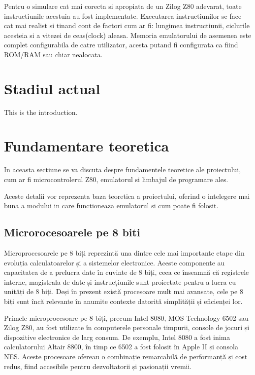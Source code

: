 \documentclass[titlepage,12pt]{article}
\begin{document}
    Pentru o simulare cat mai corecta si apropiata de un Zilog Z80 adevarat, toate instructiunile acestuia au fost implementate.
    Executarea instructiunilor se face cat mai realist si tinand cont de factori cum ar fi: lungimea instructiunii, ciclurile acesteia si a vitezei de ceas(clock) aleasa.
    Memoria emulatorului de asemenea este complet configurabila de catre utilizator, acesta putand fi configurata ca fiind \ac {ROM}/\ac {RAM} sau chiar nealocata.

    \clearpage
    \section{Stadiul actual}
    This is the introduction.


    \clearpage
    \section{Fundamentare teoretica}
    In aceasta sectiune se va discuta despre fundamentele teoretice ale proiectului, cum ar fi microcontrolerul Z80, emulatorul si limbajul de programare ales.

    Aceste detalii vor reprezenta baza teoretica a proiectului, oferind o intelegere mai buna a modului in care functioneaza emulatorul si cum poate fi folosit.

    \subsection{Microrocesoarele pe 8 biti}

    Microprocesoarele pe 8 biți reprezintă una dintre cele mai importante etape din evoluția calculatoarelor și a sistemelor electronice. Aceste componente au capacitatea de a prelucra date în cuvinte de 8 biți, ceea ce înseamnă că registrele interne, magistrala de date și instrucțiunile sunt proiectate pentru a lucra cu unități de 8 biți. Deși în prezent există procesoare mult mai avansate, cele pe 8 biți sunt încă relevante în anumite contexte datorită simplității și eficienței lor.

    Primele microprocesoare pe 8 biți, precum Intel 8080, MOS Technology 6502 sau Zilog Z80, au fost utilizate în computerele personale timpurii, console de jocuri și dispozitive electronice de larg consum. De exemplu, Intel 8080 a fost inima calculatorului Altair 8800, în timp ce 6502 a fost folosit în Apple II și consola NES. Aceste procesoare ofereau o combinație remarcabilă de performanță și cost redus, fiind accesibile pentru dezvoltatorii și pasionații vremii.
\end{document}
